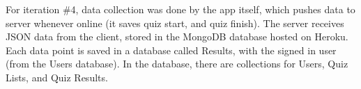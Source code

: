 For iteration \#4, data collection was done by the app itself, which pushes data to server whenever online (it saves quiz start, and quiz finish). The server receives JSON data from the client, stored in the MongoDB database hosted on Heroku. Each data point is saved in a database called Results, with the signed in user (from the Users database). In the database, there are collections for Users, Quiz Lists, and Quiz Results.
